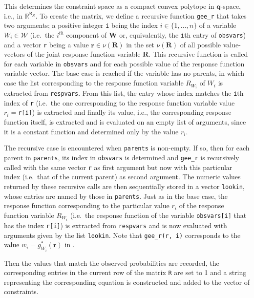 This determines the constraint space as a compact convex polytope in \(\mathbf{q}\)-space, i.e., in \(\mathbb{R}^{\aleph_\mathcal{R}}\). To create the matrix, we define a recursive function \texttt{gee\_r} that takes two arguments; a positive integer \texttt{i} being the index \(i\in\{1,\dots,n\}\) of a variable \(W_i\in\mathcal{W}\) (i.e.~the \(i^{th}\) component of \(\mathbf{W}\) or, equivalently, the \texttt{i}th entry of \texttt{obsvars}) and a vector \texttt{r} being a value \(\mathbf{r}\in\nu(\mathbf{R})\) in the set \(\nu(\mathbf{R})\) of all possible value-vectors of the joint response function variable \(\mathbf{R}\).
This recursive function is called for each variable in \texttt{obsvars} and for each possible value of the response function variable vector.
The base case is reached if the variable has no parents, in which case the list corresponding to the response function variable \(R_{W_i}\) of \(W_i\) is extracted from \texttt{respvars}. From this list, the entry whose index matches the \texttt{i}th index of \texttt{r} (i.e.~the one corresponding to the response function variable value \(r_i=\)\texttt{r{[}i{]}}) is extracted and finally its value, i.e., the corresponding response function itself, is extracted and is evaluated on an empty list of arguments, since it is a constant function and determined only by the value \(r_i\).

The recursive case is encountered when \texttt{parents} is non-empty. If so, then for each parent in \texttt{parents}, its index in \texttt{obsvars} is determined and \texttt{gee\_r} is recursively called with the same vector \texttt{r} as first argument but now with this particular index (i.e.~that of the current parent) as second argument. The numeric values returned by these recursive calls are then sequentially stored in a vector \texttt{lookin}, whose entries are named by those in \texttt{parents}. Just as in the base case, the response function corresponding to the particular value \(r_i\) of the response function variable \(R_{W_i}\) (i.e.~the response function of the variable \texttt{obsvars{[}i{]}} that has the index \texttt{r{[}i{]}}) is extracted from \texttt{respvars} and is now evaluated with arguments given by the list \texttt{lookin}.
Note that \texttt{gee\_r(r,\ i)} corresponds to the value \(w_i=g^*_{W_i}(\mathbf{r})\) in \citet{generalcausalbounds}.

Then the values that match the observed probabilities are recorded, the corresponding entries in the current row of the matrix \texttt{R} are set to 1 and a string representing the corresponding equation is constructed and added to the vector of constraints.

